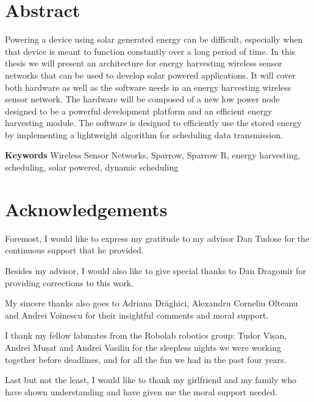 \chapter*{Abstract}

Powering a device using solar generated energy can be difficult, especially when that device is
meant to function constantly over a long period of time. In this thesis we will present an
architecture for energy harvesting wireless sensor networks that can be used to develop solar
powered applications. It will cover both hardware as well as the software needs in an energy
harvesting wireless sensor network. The hardware will be composed of a new low power node designed to be a powerful development
platform and an efficient energy harvesting module. The software is designed to efficiently use the
stored energy by implementing a lightweight algorithm for scheduling data transmission.




\textbf{Keywords} Wireless Sensor Networks, Sparrow, Sparrow R, energy harvesting, scheduling,
solar powered, dynamic scheduling

\chapter*{Acknowledgements}


Foremost, I would like to express my gratitude to my advisor Dan Tudose for the continuous support that he provided.

Besides my advisor, I would also like to give special thanks to Dan Dragomir for providing corrections to this work.

My sincere thanks also goes to Adriana Drăghici, Alexandru Corneliu Olteanu and Andrei Voinescu for their insightful comments  and moral support.

I thank my fellow labmates from the Robolab robotics group: Tudor Vișan, Andrei Mușat and Andrei Vasiliu for the sleepless nights we were working together before deadlines, and for all the fun we had in the past four years.

Last but not the least, I would like to thank my girlfriend and my family who have shown understanding and have given me the moral support needed.

